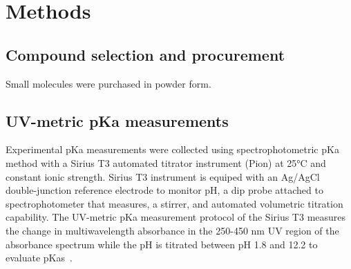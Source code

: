 \documentclass[9pt,lineno]{elife}
\begin{document}

\section{Methods}

\subsection{Compound selection and procurement}
Small molecules were purchased in powder form.



\subsection{UV-metric pKa measurements}

Experimental pKa measurements were collected using spectrophotometric pKa method with a Sirius T3 automated titrator instrument (Pion) at 25°C and constant ionic strength. Sirius T3 instrument is equiped with an Ag/AgCl double-junction reference electrode to monitor pH, a dip probe attached to spectrophotometer that measures, a stirrer, and automated volumetric titration capability. The UV-metric pKa measurement protocol of the Sirius T3 measures the change in multiwavelength absorbance in the 250-450 nm UV region of the absorbance spectrum while the pH is titrated between pH 1.8 and 12.2 to evaluate pKas~\citep{tam_multi-wavelength_2001, allen_multiwavelength_1998}. 
\end{document}
